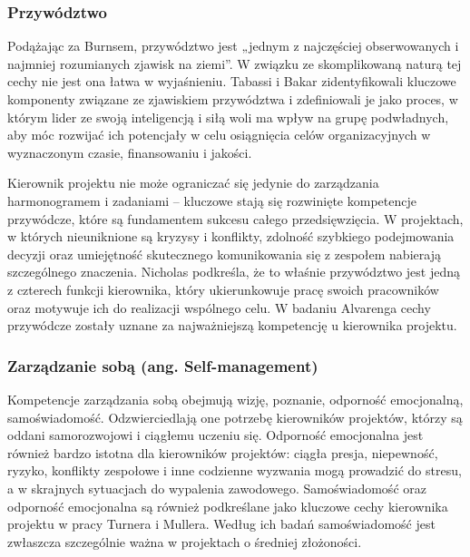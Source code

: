\subsubsection{Przywództwo}
Podążając za Burnsem, przywództwo jest „jednym z najczęściej obserwowanych i najmniej rozumianych zjawisk na ziemi”\autocite{burns}. W związku ze skomplikowaną naturą tej cechy nie jest ona łatwa w wyjaśnieniu. Tabassi i Bakar zidentyfikowali kluczowe komponenty związane ze zjawiskiem przywództwa i zdefiniowali je jako proces, w którym lider ze swoją inteligencją i siłą woli ma wpływ na grupę podwładnych, aby móc rozwijać ich potencjały w celu osiągnięcia celów organizacyjnych w wyznaczonym czasie, finansowaniu i jakości.\autocite{Tabassi} 

Kierownik projektu nie może ograniczać się jedynie do zarządzania harmonogramem i zadaniami – kluczowe stają się rozwinięte kompetencje przywódcze, które są fundamentem sukcesu całego przedsięwzięcia. W projektach, w których nieuniknione są kryzysy i konflikty, zdolność szybkiego podejmowania decyzji oraz umiejętność skutecznego komunikowania się z zespołem nabierają szczególnego znaczenia. Nicholas podkreśla, że to właśnie przywództwo jest jedną z czterech funkcji kierownika, który ukierunkowuje pracę swoich pracowników oraz motywuje ich do realizacji wspólnego celu. \autocite{NicholasSteyn} 
W badaniu Alvarenga cechy przywódcze zostały uznane za najważniejszą kompetencję u kierownika projektu.\autocite{Alvarenga}

\subsubsection{Zarządzanie sobą (ang. Self-management)}
Kompetencje zarządzania sobą obejmują wizję, poznanie, odporność emocjonalną, samoświadomość. Odzwierciedlają one potrzebę kierowników projektów, którzy są oddani samorozwojowi i ciągłemu uczeniu się. Odporność emocjonalna jest również bardzo istotna dla kierowników projektów: ciągła presja, niepewność, ryzyko, konflikty zespołowe i inne codzienne wyzwania mogą prowadzić do stresu, a w skrajnych sytuacjach do wypalenia zawodowego.\autocite{Alvarenga} Samoświadomość oraz odporność emocjonalna są również podkreślane jako kluczowe cechy kierownika projektu w pracy Turnera i Mullera. Według ich badań samoświadomość jest zwłaszcza szczególnie ważna w projektach o średniej złożoności.\autocite{turnermuller2010}

